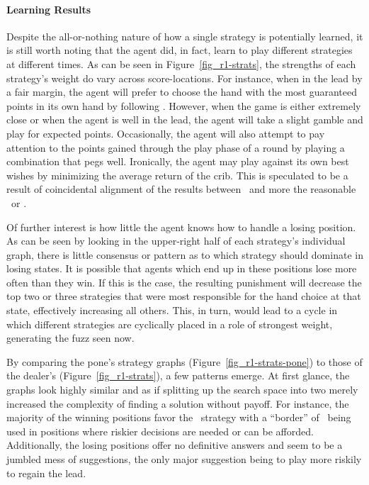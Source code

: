 



\paragraph*{Learning Results}


Despite the all-or-nothing nature of how a single strategy is potentially
learned,
it is still worth noting that the agent did, in fact, learn to play different
strategies at different times.
%
As can be seen in Figure~\ref{fig_r1-strats},
the strengths of each strategy's weight do vary across score-locations.
%
For instance,
when in the lead by a fair margin,
the agent will prefer to choose the hand with the most guaranteed
points in its own hand
by following \handmaxmin.
%
However, when the game is either extremely close
or when the agent is well in the lead,
the agent will take a slight gamble and play for expected points.
%
Occasionally, the agent will also attempt to pay attention to the points
gained through the play phase of a round by playing a combination that pegs
well.
%
Ironically,
the agent may play against its own best wishes by minimizing the average return
of the crib.
%
This is speculated to be a result of coincidental alignment of the results between
\cribminavg\ and more the reasonable \handmaxmin\
or \handmaxavg.

Of further interest is how little the agent knows how to handle a losing
position.
%
As can be seen by looking in the upper-right half of each strategy's
individual graph,
there is little consensus or pattern as to which strategy should dominate
in losing states.
%
It is possible that agents which end up in these positions lose more often than
they win.
%
If this is the case,
the resulting punishment will decrease the top two or three strategies that were
most responsible for the hand choice at that state,
effectively increasing all others.
%
This, in turn, would lead to a cycle in which different strategies
are cyclically placed in a role of strongest weight,
generating the fuzz seen now.

By comparing the pone's strategy graphs (Figure~\ref{fig_r1-strats-pone})
to those of the dealer's (Figure~\ref{fig_r1-strats}),
a few patterns emerge.
%
At first glance,
the graphs look highly similar and as if splitting up the search space into two
merely increased the complexity of finding a solution without payoff.
%
For instance,
the majority of the winning positions favor the \handmaxmin\ strategy with
a ``border'' of \handmaxavg\ being used in positions where riskier decisions
are needed or can be afforded.
%
Additionally, the losing positions offer no definitive answers and seem to be a
jumbled mess of suggestions,
the only major suggestion being to play more riskily to regain the lead.

